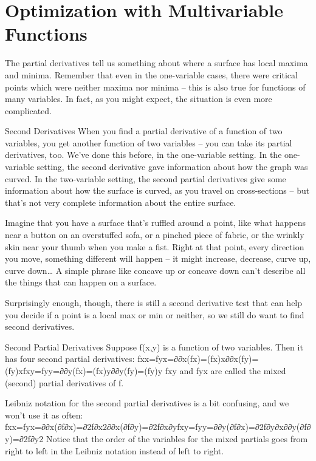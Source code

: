 \section{Optimization with Multivariable Functions}
\label{sec:multi-opt}

The partial derivatives tell us something about where a surface has local maxima and minima. Remember that even in the one-variable cases, there were critical points which were neither maxima nor minima – this is also true for functions of many variables. In fact, as you might expect, the situation is even more complicated.

Second Derivatives
When you find a partial derivative of a function of two variables, you get another function of two variables – you can take its partial derivatives, too. We've done this before, in the one-variable setting. In the one-variable setting, the second derivative gave information about how the graph was curved. In the two-variable setting, the second partial derivatives give some information about how the surface is curved, as you travel on cross-sections – but that's not very complete information about the entire surface.

Imagine that you have a surface that's ruffled around a point, like what happens near a button on an overstuffed sofa, or a pinched piece of fabric, or the wrinkly skin near your thumb when you make a fist. Right at that point, every direction you move, something different will happen – it might increase, decrease, curve up, curve down… A simple phrase like concave up or concave down can't describe all the things that can happen on a surface.

Surprisingly enough, though, there is still a second derivative test that can help you decide if a point is a local max or min or neither, so we still do want to find second derivatives.

Second Partial Derivatives
Suppose f(x,y) is a function of two variables. Then it has four second partial derivatives:
fxx=fyx=∂∂x(fx)=(fx)x∂∂x(fy)=(fy)xfxy=fyy=∂∂y(fx)=(fx)y∂∂y(fy)=(fy)y
fxy and fyx are called the mixed (second) partial derivatives of f.

Leibniz notation for the second partial derivatives is a bit confusing, and we won't use it as often:
fxx=fyx=∂∂x(∂f∂x)=∂2f∂x2∂∂x(∂f∂y)=∂2f∂x∂yfxy=fyy=∂∂y(∂f∂x)=∂2f∂y∂x∂∂y(∂f∂y)=∂2f∂y2
Notice that the order of the variables for the mixed partials goes from right to left in the Leibniz notation instead of left to right.

